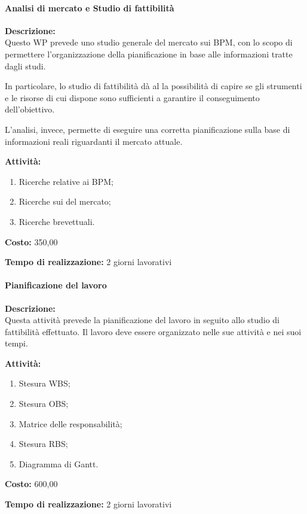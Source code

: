 \paragraph{Analisi di mercato e Studio di fattibilità}
\begin{description}
  \item{\bfseries Descrizione:}\\
Questo WP prevede uno studio generale del mercato sui  BPM, con lo scopo di permettere l'organizzazione della pianificazione in base alle informazioni tratte dagli studi.
		
In particolare, lo studio di fattibilità dà al  la possibilità di capire se gli strumenti e le risorse di cui dispone sono sufficienti a garantire il conseguimento dell'obiettivo.

L'analisi, invece, permette di eseguire una corretta pianificazione sulla base di informazioni reali riguardanti il mercato attuale. 
  \item{\bfseries Attività:}
  \begin{enumerate}
    \item Ricerche relative ai \sw BPM;
    \item Ricerche sui  del mercato;
    \item Ricerche brevettuali.
  \end{enumerate}
  \item  {\bfseries Costo:} \text{\euro} 350,00 
  \item  {\bfseries Tempo di realizzazione:} 2 giorni lavorativi
\end{description}

\paragraph{Pianificazione del lavoro}
\begin{description}
\item{\bfseries Descrizione:}\\
Questa attività prevede la pianificazione del lavoro in seguito allo studio di fattibilità effettuato. Il lavoro deve essere organizzato nelle sue attività e nei suoi tempi.
\item{\bfseries Attività:}
	\begin{enumerate}
		\item Stesura WBS;
		\item Stesura OBS;
		\item Matrice delle responsabilità;
		\item Stesura RBS;
		\item Diagramma di Gantt.
  \end{enumerate}
  \item{\bfseries Costo:} \text{\euro} 600,00 
  \item{\bfseries Tempo di realizzazione:} 2 giorni lavorativi
\end{description}

